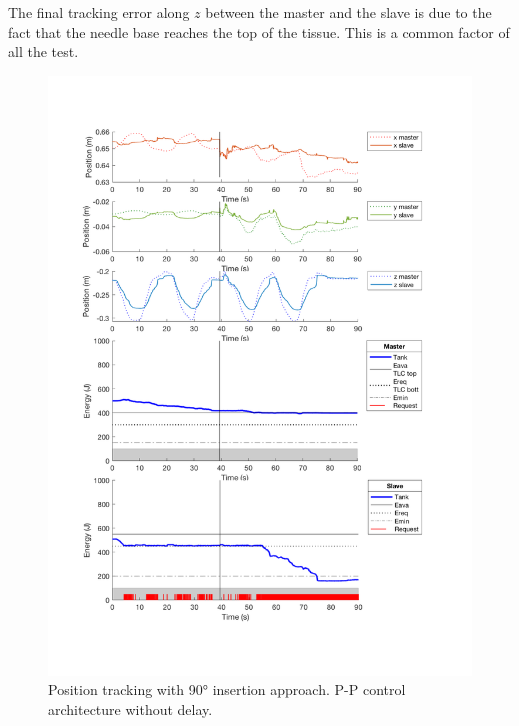 The final tracking error along $z$ between the master and the slave is due to the fact that the needle base reaches the top of the tissue. This is a common factor of all the test.
\begin{center}
	\begin{figure}
		\includegraphics[width=\textwidth, keepaspectratio]{plots/pp90/Position.pdf}
		\caption{Position tracking with 90° insertion approach. P-P control architecture without delay.}
		\label{graph:pp90/Position}
	\end{figure}
\end{center}
